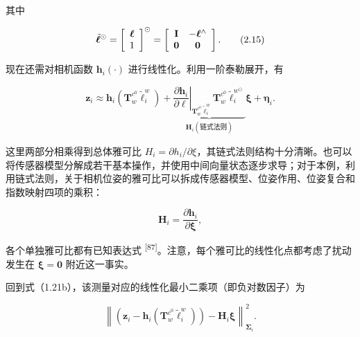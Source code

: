 其中

\begin{equation}
\tilde {\boldsymbol {\ell}} ^ {\odot} = \left[ \begin{array}{c} \boldsymbol {\ell} \\ 1 \end{array} \right] ^ {\odot} = \left[ \begin{array}{c c} \mathbf {I} & - \boldsymbol {\ell} ^ {\wedge} \\ \mathbf {0} & \mathbf {0} \end{array} \right].\tag{2.15}
\end{equation}

现在还需对相机函数 $\pmb h_i(\cdot)$ 进行线性化。利用一阶泰勒展开，有

\begin{equation}
\boldsymbol {z} _ {i} \approx \boldsymbol {h} _ {i} \left(\boldsymbol {T} _ {w} ^ {c ^ {0}} \tilde {\ell} _ {i} ^ {w}\right) + \underbrace {\left. \frac {\partial \boldsymbol {h} _ {i}}{\partial \boldsymbol {\ell}} \right| _ {\boldsymbol {T} _ {w} ^ {c ^ {0}} \tilde {\ell} _ {i} ^ {w}} \boldsymbol {T} _ {w} ^ {c ^ {0}} \tilde {\ell} _ {i} ^ {w ^ {\odot}}} _ {\boldsymbol {H} _ {i} (\text {链式法则})} \boldsymbol {\xi} + \boldsymbol {\eta} _ {i}.\tag{2.16}
\end{equation}

这里两部分相乘得到总体雅可比 $H_i=\partial h_i/\partial\xi$，其链式法则结构十分清晰。也可以将传感器模型分解成若干基本操作，并使用中间向量状态逐步求导；对于本例，利用链式法则，关于相机位姿的雅可比可以拆成传感器模型、位姿作用、位姿复合和指数映射四项的乘积：

\begin{equation}
\boldsymbol {H} _ {i} = \frac {\partial \boldsymbol {h} _ {i}}{\partial \boldsymbol {\xi}},\tag{2.17}
\end{equation}

各个单独雅可比都有已知表达式 \textsuperscript{[87]}。注意，每个雅可比的线性化点都考虑了扰动发生在 $\pmb\xi=\mathbf0$ 附近这一事实。

回到式（1.21b），该测量对应的线性化最小二乘项（即负对数因子）为

\begin{equation}
\left\| \left(\boldsymbol {z} _ {i} - \boldsymbol {h} _ {i} \left(\boldsymbol {T} _ {w} ^ {c ^ {0}} \tilde {\ell} _ {i} ^ {w}\right)\right) - \boldsymbol {H} _ {i} \boldsymbol {\xi} \right\| _ {\boldsymbol {\Sigma} _ {i}} ^ {2}.\tag{2.18}
\end{equation}

